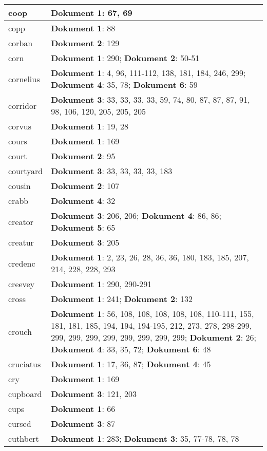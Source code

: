 \documentclass[a5paper]{article}
\begin{document}
\begin{longtable}[l]{|l|p{3in}|}
\hline
coop & \textbf{Dokument 1}: 67, 69 \\
\hline
copp & \textbf{Dokument 1}: 88 \\
\hline
corban & \textbf{Dokument 2}: 129 \\
\hline
corn & \textbf{Dokument 1}: 290; \textbf{Dokument 2}: 50-51 \\
\hline
cornelius & \textbf{Dokument 1}: 4, 96, 111-112, 138, 181, 184, 246, 299; \textbf{Dokument 4}: 35, 78; \textbf{Dokument 6}: 59 \\
\hline
corridor & \textbf{Dokument 3}: 33, 33, 33, 33, 59, 74, 80, 87, 87, 87, 91, 98, 106, 120, 205, 205, 205 \\
\hline
corvus & \textbf{Dokument 1}: 19, 28 \\
\hline
cours & \textbf{Dokument 1}: 169 \\
\hline
court & \textbf{Dokument 2}: 95 \\
\hline
courtyard & \textbf{Dokument 3}: 33, 33, 33, 33, 183 \\
\hline
cousin & \textbf{Dokument 2}: 107 \\
\hline
crabb & \textbf{Dokument 4}: 32 \\
\hline
creator & \textbf{Dokument 3}: 206, 206; \textbf{Dokument 4}: 86, 86; \textbf{Dokument 5}: 65 \\
\hline
creatur & \textbf{Dokument 3}: 205 \\
\hline
credenc & \textbf{Dokument 1}: 2, 23, 26, 28, 36, 36, 180, 183, 185, 207, 214, 228, 228, 293 \\
\hline
creevey & \textbf{Dokument 1}: 290, 290-291 \\
\hline
cross & \textbf{Dokument 1}: 241; \textbf{Dokument 2}: 132 \\
\hline
crouch & \textbf{Dokument 1}: 56, 108, 108, 108, 108, 108, 110-111, 155, 181, 181, 185, 194, 194, 194-195, 212, 273, 278, 298-299, 299, 299, 299, 299, 299, 299, 299, 299; \textbf{Dokument 2}: 26; \textbf{Dokument 4}: 33, 35, 72; \textbf{Dokument 6}: 48 \\
\hline
cruciatus & \textbf{Dokument 1}: 17, 36, 87; \textbf{Dokument 4}: 45 \\
\hline
cry & \textbf{Dokument 1}: 169 \\
\hline
cupboard & \textbf{Dokument 3}: 121, 203 \\
\hline
cups & \textbf{Dokument 1}: 66 \\
\hline
cursed & \textbf{Dokument 3}: 87 \\
\hline
cuthbert & \textbf{Dokument 1}: 283; \textbf{Dokument 3}: 35, 77-78, 78, 78 \\

\end{longtable}
\end{document}

